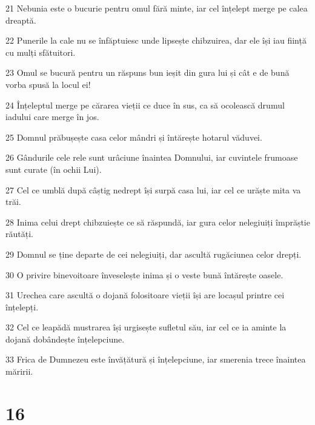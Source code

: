 \par 21 Nebunia este o bucurie pentru omul fără minte, iar cel înțelept merge pe calea dreaptă.
\par 22 Punerile la cale nu se înfăptuiesc unde lipsește chibzuirea, dar ele își iau ființă cu mulți sfătuitori.
\par 23 Omul se bucură pentru un răspuns bun ieșit din gura lui și cât e de bună vorba spusă la locul ei!
\par 24 Înțeleptul merge pe cărarea vieții ce duce în sus, ca să ocolească drumul iadului care merge în jos.
\par 25 Domnul prăbușește casa celor mândri și întărește hotarul văduvei.
\par 26 Gândurile cele rele sunt urâciune înaintea Domnului, iar cuvintele frumoase sunt curate (în ochii Lui).
\par 27 Cel ce umblă după câștig nedrept își surpă casa lui, iar cel ce urăște mita va trăi.
\par 28 Inima celui drept chibzuiește ce să răspundă, iar gura celor nelegiuiți împrăștie răutăți.
\par 29 Domnul se ține departe de cei nelegiuiți, dar ascultă rugăciunea celor drepți.
\par 30 O privire binevoitoare înveselește inima și o veste bună întărește oasele.
\par 31 Urechea care ascultă o dojană folositoare vieții își are locașul printre cei înțelepți.
\par 32 Cel ce leapădă mustrarea își urgisește sufletul său, iar cel ce ia aminte la dojană dobândește înțelepciune.
\par 33 Frica de Dumnezeu este învățătură și înțelepciune, iar smerenia trece înaintea măririi.

\chapter{16}

